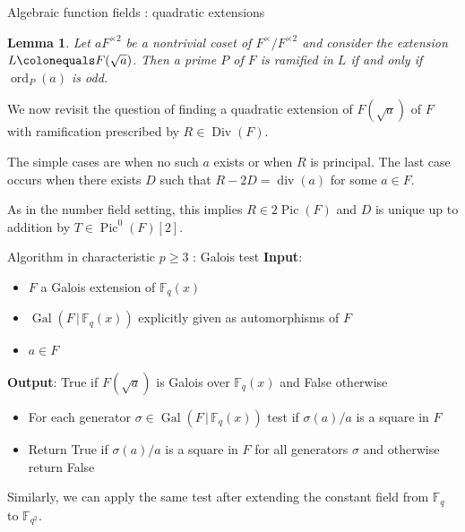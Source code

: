 \documentclass[xcolor=dvipsnames]{beamer}
\theoremstyle{plain}
\newtheorem*{lem}{Lemma}
\newcommand{\FF}{\mathbb{F}}
\DeclareMathOperator{\Div}{Div}
\DeclareMathOperator{\Pic}{Pic}
\DeclareMathOperator{\ddiv}{div}
\DeclareMathOperator{\Gal}{Gal}
\DeclareMathOperator{\ord}{ord}
\begin{document}
  \begin{frame}{Algebraic function fields : quadratic extensions}
    \begin{lem}
      \vspace{1pt}
      Let $aF^{\times 2}$ be a nontrivial coset of
      $F^\times/F^{\times 2}$ and consider the
      extension $L\colonequals F(\sqrt{a})$.
      Then a prime $P$ of $F$ is
      ramified in $L$
      if and only if
      $\ord_P(a)$ is odd.
    \end{lem}
    We now revisit the question of finding a quadratic extension
    of $F(\sqrt{a})$ of $F$ with ramification prescribed
    by $R\in\Div(F)$.
    \par
    The simple cases are when no such $a$ exists
    or when $R$ is principal.
    The last case occurs when there exists
    $D$ such that $R-2D=\ddiv(a)$ for some $a\in F$.
    \par
    As in the number field setting, this implies
    $R\in 2\Pic(F)$ and $D$ is unique up to
    addition by $T\in\Pic^0(F)[2]$.
  \end{frame}
  \begin{frame}{Algorithm in characteristic $p\geq 3$ : Galois test}
    \textbf{Input}:
    \begin{itemize}
      \item
        $F$ a Galois extension of $\FF_q(x)$
      \item
        $\Gal(F\,|\,\FF_q(x))$ explicitly given as automorphisms of $F$
      \item
        $a\in F$
    \end{itemize}
    \textbf{Output}:
    True if $F(\sqrt{a})$ is Galois over $\FF_q(x)$
    and False otherwise
    \par
    \begin{itemize}
      \item
        For each generator $\sigma\in\Gal(F\,|\,\FF_q(x))$
        test if $\sigma(a)/a$ is a square in $F$
      \item
        Return True if $\sigma(a)/a$ is a square in $F$
        for all generators $\sigma$
        and otherwise return False
    \end{itemize}
    \par
    Similarly, we can apply the same test after
    extending the constant field from $\FF_q$
    to $\FF_{q^2}$.
  \end{frame}
\end{document}
